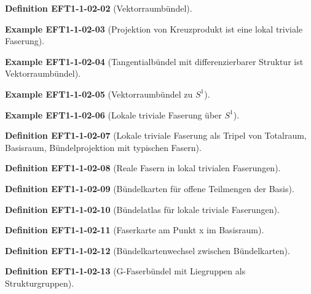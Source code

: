 \documentclass[10pt, letterpaper]{article}
\newcommand{\CustomHeading}[3]{%
  \par\medskip\noindent%
  \textbf{#1 #2} \textnormal{(#3)}.\enskip%
}
\newenvironment{DEF}[2]{\CustomHeading{Definition}{#1}{#2}}{}
\newenvironment{EXA}[2]{\CustomHeading{Example}{#1}{#2}}{}
\begin{document}
\begin{DEF}{EFT1-1-02-02}{Vektorraumbündel}
\end{DEF}

\begin{EXA}{EFT1-1-02-03}{Projektion von Kreuzprodukt ist eine lokal triviale Faserung}
\end{EXA}

\begin{EXA}{EFT1-1-02-04}{Tangentialbündel mit differenzierbarer Struktur ist Vektorraumbündel}
\end{EXA}

\begin{EXA}{EFT1-1-02-05}{Vektorraumbündel zu $S^1$}
\end{EXA}

\begin{EXA}{EFT1-1-02-06}{Lokale triviale Faserung über $S^1$}
\end{EXA}

\begin{DEF}{EFT1-1-02-07}{Lokale triviale Faserung als Tripel von Totalraum, Basisraum, Bündelprojektion mit typischen Fasern}
\end{DEF}

\begin{DEF}{EFT1-1-02-08}{Reale Fasern in lokal trivialen Faserungen}
\end{DEF}

\begin{DEF}{EFT1-1-02-09}{Bündelkarten für offene Teilmengen der Basis}
\end{DEF}

\begin{DEF}{EFT1-1-02-10}{Bündelatlas für lokale triviale Faserungen}
\end{DEF}

\begin{DEF}{EFT1-1-02-11}{Faserkarte am Punkt x im Basisraum}
\end{DEF}

\begin{DEF}{EFT1-1-02-12}{Bündelkartenwechsel zwischen Bündelkarten}
\end{DEF}

\begin{DEF}{EFT1-1-02-13}{G-Faserbündel mit Liegruppen als Strukturgruppen}
\end{DEF}
\end{document}
